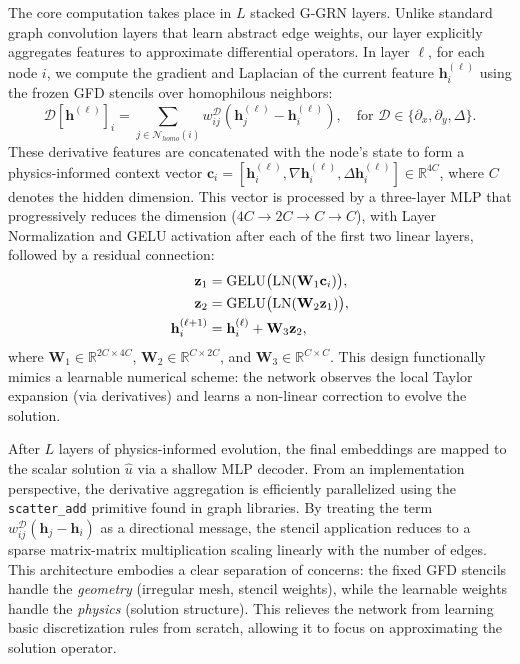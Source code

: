 \documentclass[11pt]{article}
\theoremstyle{definition}
\theoremstyle{remark}
\theoremstyle{plain}
\begin{document}
The core computation takes place in $L$ stacked G-GRN layers. Unlike standard graph convolution layers that learn abstract edge weights, our layer explicitly aggregates features to approximate differential operators. In layer $\ell$, for each node $i$, we compute the gradient and Laplacian of the current feature $\mathbf{h}_i^{(\ell)}$ using the frozen GFD stencils over homophilous neighbors:
\begin{equation}
    \mathcal{D}[\mathbf{h}^{(\ell)}]_i = \sum_{j \in \mathcal{N}_{homo}(i)} w_{ij}^{\mathcal{D}} (\mathbf{h}_j^{(\ell)} - \mathbf{h}_i^{(\ell)}), \quad \text{for } \mathcal{D} \in \{ \partial_x, \partial_y, \Delta \}.
\end{equation}
These derivative features are concatenated with the node's state to form a physics-informed context vector $\mathbf{c}_i = [\mathbf{h}_i^{(\ell)}, \nabla \mathbf{h}_i^{(\ell)}, \Delta \mathbf{h}_i^{(\ell)}] \in \mathbb{R}^{4C}$, where $C$ denotes the hidden dimension. This vector is processed by a three-layer MLP that progressively reduces the dimension ($4C \to 2C \to C \to C$), with Layer Normalization and GELU activation after each of the first two linear layers, followed by a residual connection:
\begin{align}
    \mathbf{z}_1 &= \text{GELU}\bigl(\text{LN}(\mathbf{W}_1 \mathbf{c}_i)\bigr), \notag \\
    \mathbf{z}_2 &= \text{GELU}\bigl(\text{LN}(\mathbf{W}_2 \mathbf{z}_1)\bigr), \\
    \mathbf{h}_i^{(\ell+1)} &= \mathbf{h}_i^{(\ell)} + \mathbf{W}_3 \mathbf{z}_2, \notag
\end{align}
where $\mathbf{W}_1 \in \mathbb{R}^{2C \times 4C}$, $\mathbf{W}_2 \in \mathbb{R}^{C \times 2C}$, and $\mathbf{W}_3 \in \mathbb{R}^{C \times C}$.
This design functionally mimics a learnable numerical scheme: the network observes the local Taylor expansion (via derivatives) and learns a non-linear correction to evolve the solution.

After $L$ layers of physics-informed evolution, the final embeddings are mapped to the scalar solution $\hat{u}$ via a shallow MLP decoder. From an implementation perspective, the derivative aggregation is efficiently parallelized using the \texttt{scatter\_add} primitive found in graph libraries. By treating the term $w_{ij}^{\mathcal{D}}(\mathbf{h}_j - \mathbf{h}_i)$ as a directional message, the stencil application reduces to a sparse matrix-matrix multiplication scaling linearly with the number of edges. This architecture embodies a clear separation of concerns: the fixed GFD stencils handle the \textit{geometry} (irregular mesh, stencil weights), while the learnable weights handle the \textit{physics} (solution structure). This relieves the network from learning basic discretization rules from scratch, allowing it to focus on approximating the solution operator.
\end{document}
